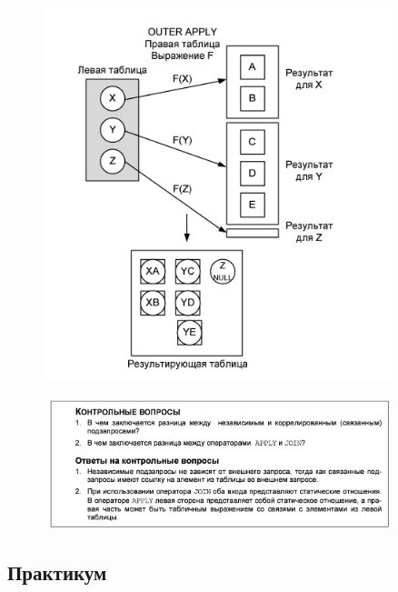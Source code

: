 \begin{figure}[h!]
	\begin{center}
		\includegraphics[width=0.9\textwidth]{img/outerapply.png}
	\end{center}
	\captionsetup{justification=centering}
\end{figure}


\begin{figure}[h!]
	\begin{center}
		\includegraphics[width=0.9\textwidth]{img/control12.png}
	\end{center}
	\captionsetup{justification=centering}
\end{figure}

\subsection*{Практикум}

